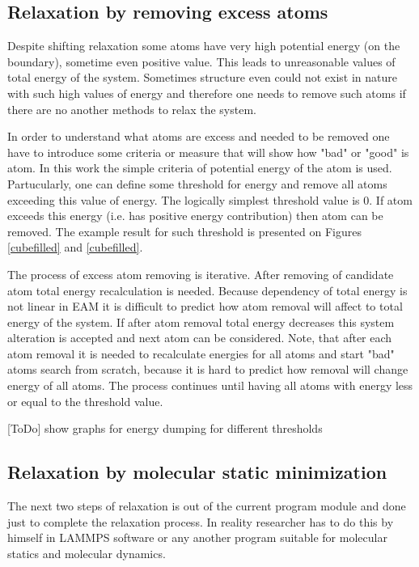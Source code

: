 \documentclass[12pt]{report}
\begin{document}
\subsection{Relaxation by removing excess atoms}

Despite shifting relaxation some atoms have very high potential energy (on the boundary), sometime even positive value. This leads to unreasonable values of total energy of the system. Sometimes structure even could not exist in nature with such high values of energy and therefore one needs to remove such atoms if there are no another methods to relax the system.

In order to understand what atoms are excess and needed to be removed one have to introduce some criteria or measure that will show how "bad" or "good" is atom. In this work the simple criteria of potential energy of the atom is used. Partucularly, one can define some threshold for energy and remove all atoms exceeding this value of energy. The logically simplest threshold value is 0. If atom exceeds this energy (i.e. has positive energy contribution) then atom can be removed. The example result for such threshold is presented on Figures \ref{cubefilled} and \ref{cubefilled}.

The process of excess atom removing is iterative. After removing of candidate atom total energy recalculation is needed. Because dependency of total energy is not linear in EAM it is difficult to predict how atom removal will affect to total energy of the system. If after atom removal total energy decreases this system alteration is accepted and next atom can be considered. Note, that after each atom removal it is needed to recalculate energies for all atoms and start "bad" atoms search from scratch, because it is hard to predict how removal will change energy of all atoms. The process continues until having all atoms with energy less or equal to the threshold value.


[ToDo] show graphs for energy dumping for different thresholds

\subsection{Relaxation by molecular static minimization}

The next two steps of relaxation is out of the current program module and done just to complete the relaxation process. In reality researcher has to do this by himself in LAMMPS software or any another program suitable for molecular statics and molecular dynamics.
\end{document}
